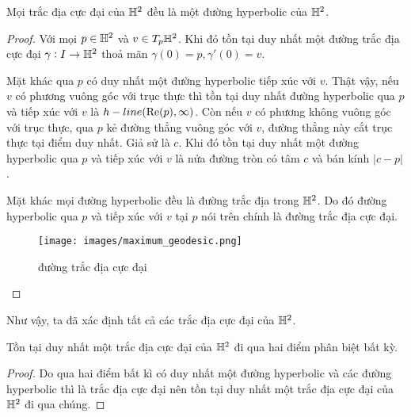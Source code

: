 \begin{prop}\label{prop 2.2.17}
    Mọi trắc địa cực đại của $\mathbb{H}^2$ đều là một đường hyperbolic của $\mathbb{H}^2$.
\end{prop}
\begin{proof}
    Với mọi $p\in \mathbb{H}^2$ và $v \in T_p\mathbb{H}^2$. Khi đó tồn tại duy nhất một đường trắc địa cực đại $\gamma: I \to \mathbb{H}^2$ thoả mãn $\gamma(0) = p, \gamma'(0) = v$. 
    
    Mặt khác qua $p$ có duy nhất một đường hyperbolic tiếp xúc với $v$. Thật vậy, nếu $v$ có phương vuông góc với trục thực thì tồn tại duy nhất đường hyperbolic qua $p$ và tiếp xúc với $v$ là $h-line(\operatorname{Re}(p),\infty)$. Còn nếu $v$ có phương không vuông góc với trục thực, qua $p$ kẻ đường thẳng vuông góc với $v$, đường thẳng này cắt trục thực tại điểm duy nhất. Giả sử là $c$. Khi đó tồn tại duy nhất một đường hyperbolic qua $p$ và tiếp xúc với $v$ là nửa đường tròn có tâm $c$ và bán kính $|c-p|$.

    Mặt khác mọi đường hyperbolic đều là đường trắc địa trong $\mathbb{H}^2$. Do đó đường hyperbolic qua $p$ và tiếp xúc với $v$ tại $p$ nói trên chính là đường trắc địa cực đại.
    \begin{figure}[htp!]
        \centering
        \texttt{[image: images/maximum\_geodesic.png]}
        \caption{đường trắc địa cực đại}
        \label{fig:enter-label}
    \end{figure}
    
\end{proof}
Như vậy, ta đã xác định tất cả các trắc địa cực đại của $\mathbb{H}^2$.
\begin{cor}\label{cor 2.2.18}
    Tồn tại duy nhất một trắc địa cực đại của $\mathbb{H}^2$ đi qua hai điểm phân biệt bất kỳ.
\end{cor}
\begin{proof}
    Do qua hai điểm bất kì có duy nhất một đường hyperbolic và các đường hyperbolic thì là trắc địa cực đại nên tồn tại duy nhất một trắc địa cực đại của $\mathbb{H}^2$ đi qua chúng.
\end{proof}








